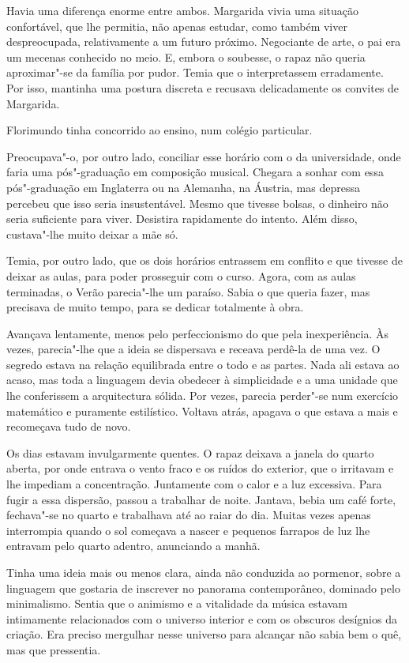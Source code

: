 Havia uma diferença enorme entre ambos. Margarida vivia uma situação
confortável, que lhe permitia, não apenas estudar, como também viver
despreocupada, relativamente a um futuro próximo. Negociante de arte, o
pai era um mecenas conhecido no meio. E, embora o soubesse, o rapaz não
queria aproximar"-se da família por pudor. Temia que o interpretassem
erradamente. Por isso, mantinha uma postura discreta e recusava
delicadamente os convites de Margarida.

Florimundo tinha concorrido ao ensino, num colégio particular.

Preocupava"-o, por outro lado, conciliar esse horário com o da
universidade, onde faria uma pós"-graduação em composição musical.
Chegara a sonhar com essa pós"-graduação em Inglaterra ou na Alemanha, na
Áustria, mas depressa percebeu que isso seria insustentável. Mesmo que
tivesse bolsas, o dinheiro não seria suficiente para viver. Desistira
rapidamente do intento. Além disso, custava"-lhe muito deixar a mãe só.

Temia, por outro lado, que os dois horários entrassem em conflito e que
tivesse de deixar as aulas, para poder prosseguir com o curso. Agora,
com as aulas terminadas, o Verão parecia"-lhe um paraíso. Sabia o que
queria fazer, mas precisava de muito tempo, para se dedicar totalmente à
obra.

Avançava lentamente, menos pelo perfeccionismo do que pela
inexperiência. Às vezes, parecia"-lhe que a ideia se dispersava e receava
perdê-la de uma vez. O segredo estava na relação equilibrada entre o
todo e as partes. Nada ali estava ao acaso, mas toda a linguagem devia
obedecer à simplicidade e a uma unidade que lhe conferissem a
arquitectura sólida. Por vezes, parecia perder"-se num exercício
matemático e puramente estilístico. Voltava atrás, apagava o que estava
a mais e recomeçava tudo de novo.

Os dias estavam invulgarmente quentes. O rapaz deixava a janela do
quarto aberta, por onde entrava o vento fraco e os ruídos do exterior,
que o irritavam e lhe impediam a concentração. Juntamente com o calor e
a luz excessiva. Para fugir a essa dispersão, passou a trabalhar de
noite. Jantava, bebia um café forte, fechava"-se no quarto e trabalhava
até ao raiar do dia. Muitas vezes apenas interrompia quando o sol
começava a nascer e pequenos farrapos de luz lhe entravam pelo quarto
adentro, anunciando a manhã.

Tinha uma ideia mais ou menos clara, ainda não conduzida ao pormenor,
sobre a linguagem que gostaria de inscrever no panorama contemporâneo,
dominado pelo minimalismo. Sentia que o animismo e a vitalidade da
música estavam intimamente relacionados com o universo interior e com os
obscuros desígnios da criação. Era preciso mergulhar nesse universo para
alcançar não sabia bem o quê, mas que pressentia.

